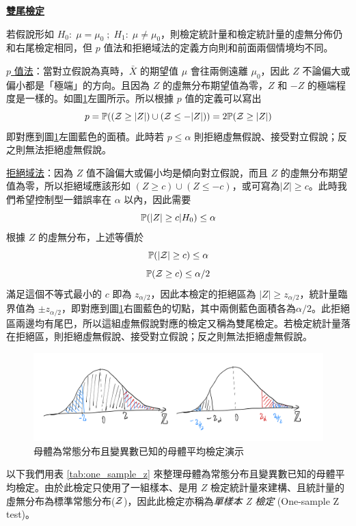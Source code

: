     \noindent\underline{\textbf{雙尾檢定}}

    若假說形如 $H_0: \; \mu = \mu_0 \; ; \; H_1: \; \mu \ne \mu_0$，則檢定統計量和檢定統計量的虛無分佈仍和右尾檢定相同，但 $p$ 值法和拒絕域法的定義方向則和前面兩個情境均不同。

    \noindent \underline{$p$ 值法}：當對立假說為真時，$\bar{X}$ 的期望值 $\mu$ 會往兩側遠離 $\mu_0$，因此 $Z$ 不論偏大或偏小都是「極端」的方向。且因為 $Z$ 的虛無分布期望值為零，$Z$ 和 $-Z$ 的極端程度是一樣的。如圖\ref{fig:one_sample_z}左圖所示。所以根據 $p$ 值的定義可以寫出
    \[p = \mathbb{P}((\mathcal{Z} \ge |Z|)\cup(\mathcal{Z} \le -|Z|)) = 2\mathbb{P}(\mathcal{Z} \ge |Z|)\]
    即對應到圖\ref{fig:one_sample_z}左圖藍色的面積。此時若 $p \le \alpha$ 則拒絕虛無假說、接受對立假說；反之則無法拒絕虛無假說。
    
    \noindent \underline{拒絕域法}：因為 $Z$ 值不論偏大或偏小均是傾向對立假說，而且 $Z$ 的虛無分布期望值為零，所以拒絕域應該形如 $(Z \ge c)\cup(Z \le -c)$，或可寫為$|Z| \ge c$。此時我們希望控制型一錯誤率在 $\alpha$ 以內，因此需要
    \[\mathbb{P}(|Z| \ge c|H_0) \le \alpha\]
    根據 $Z$ 的虛無分布，上述等價於
    \[\mathbb{P}(|\mathcal{Z}| \ge c) \le \alpha\]
    \[\mathbb{P}(\mathcal{Z} \ge c) \le \alpha/2\]
    滿足這個不等式最小的 $c$ 即為 $z_{\alpha/2}$，因此本檢定的拒絕區為 $|Z| \ge z_{\alpha/2}$，統計量臨界值為 $\pm z_{\alpha/2}$，即對應到圖\ref{fig:one_sample_z}右圖藍色的切點，其中兩側藍色面積各為$\alpha/2$。此拒絕區兩邊均有尾巴，所以這組虛無假說對應的檢定又稱為雙尾檢定。若檢定統計量落在拒絕區，則拒絕虛無假說、接受對立假說；反之則無法拒絕虛無假說。

    \begin{figure}[htbp]
        \centering
        \includegraphics[width=\textwidth]{figures/06-Hypothesis_testing/one_sample_z.jpeg}
        \caption{母體為常態分布且變異數已知的母體平均檢定演示}
        \label{fig:one_sample_z}
    \end{figure}

    以下我們用表 \ref{tab:one_sample_z} 來整理母體為常態分布且變異數已知的母體平均檢定。由於此檢定只使用了一組樣本、是用 $Z$ 檢定統計量來建構、且統計量的虛無分布為標準常態分布($\mathcal{Z}$)，因此此檢定亦稱為\textit{單樣本 Z 檢定} (One-sample Z test)。

